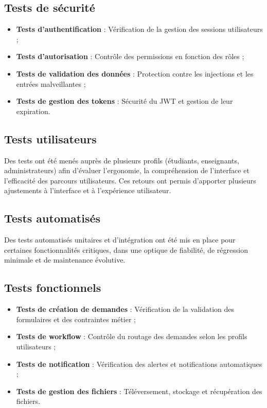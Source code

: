 \subsection{Tests de sécurité}



\begin{itemize}
  \item \textbf{Tests d’authentification} : Vérification de la gestion des sessions utilisateurs ;
  \item \textbf{Tests d’autorisation} : Contrôle des permissions en fonction des rôles ;
  \item \textbf{Tests de validation des données} : Protection contre les injections et les entrées malveillantes ;
  \item \textbf{Tests de gestion des tokens} : Sécurité du JWT et gestion de leur expiration.
\end{itemize}

\subsection{Tests utilisateurs}

Des tests ont été menés auprès de plusieurs profils (étudiants, enseignants, administrateurs) afin d’évaluer l’ergonomie, la compréhension de l’interface et l'efficacité des parcours utilisateurs. Ces retours ont permis d'apporter plusieurs ajustements à l’interface et à l’expérience utilisateur.

\subsection{Tests automatisés}

Des tests automatisés unitaires et d’intégration ont été mis en place pour certaines fonctionnalités critiques, dans une optique de fiabilité, de régression minimale et de maintenance évolutive.

\subsection{Tests fonctionnels}

\begin{itemize}
  \item \textbf{Tests de création de demandes} : Vérification de la validation des formulaires et des contraintes métier ;
  \item \textbf{Tests de workflow} : Contrôle du routage des demandes selon les profils utilisateurs ;
  \item \textbf{Tests de notification} : Vérification des alertes et notifications automatiques ;
  \item \textbf{Tests de gestion des fichiers} : Téléversement, stockage et récupération des fichiers.
\end{itemize}

